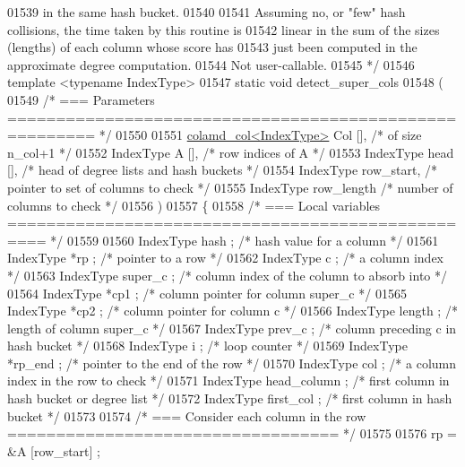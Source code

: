 \begin{DoxyCode}
{{{{{{{{{{{{{{{{{{{{{{{{{{{{01539 \textcolor{comment}{  in the same hash bucket.}
01540 \textcolor{comment}{}
01541 \textcolor{comment}{  Assuming no, or "few" hash collisions, the time taken by this routine is}
01542 \textcolor{comment}{  linear in the sum of the sizes (lengths) of each column whose score has}
01543 \textcolor{comment}{  just been computed in the approximate degree computation.}
01544 \textcolor{comment}{  Not user-callable.}
01545 \textcolor{comment}{*/}
01546 \textcolor{keyword}{template} <\textcolor{keyword}{typename} IndexType>
01547 \textcolor{keyword}{static} \textcolor{keywordtype}{void} detect\_super\_cols
01548 (
01549   \textcolor{comment}{/* === Parameters ======================================================= */}
01550   
01551   \hyperlink{structinternal_1_1colamd__col}{colamd\_col<IndexType>} Col [],    \textcolor{comment}{/* of size n\_col+1 */}
01552   IndexType A [],     \textcolor{comment}{/* row indices of A */}
01553   IndexType head [],    \textcolor{comment}{/* head of degree lists and hash buckets */}
01554   IndexType row\_start,    \textcolor{comment}{/* pointer to set of columns to check */}
01555   IndexType row\_length    \textcolor{comment}{/* number of columns to check */}
01556 )
01557 \{
01558   \textcolor{comment}{/* === Local variables ================================================== */}
01559 
01560   IndexType hash ;      \textcolor{comment}{/* hash value for a column */}
01561   IndexType *rp ;     \textcolor{comment}{/* pointer to a row */}
01562   IndexType c ;     \textcolor{comment}{/* a column index */}
01563   IndexType super\_c ;   \textcolor{comment}{/* column index of the column to absorb into */}
01564   IndexType *cp1 ;      \textcolor{comment}{/* column pointer for column super\_c */}
01565   IndexType *cp2 ;      \textcolor{comment}{/* column pointer for column c */}
01566   IndexType length ;    \textcolor{comment}{/* length of column super\_c */}
01567   IndexType prev\_c ;    \textcolor{comment}{/* column preceding c in hash bucket */}
01568   IndexType i ;     \textcolor{comment}{/* loop counter */}
01569   IndexType *rp\_end ;   \textcolor{comment}{/* pointer to the end of the row */}
01570   IndexType col ;     \textcolor{comment}{/* a column index in the row to check */}
01571   IndexType head\_column ;   \textcolor{comment}{/* first column in hash bucket or degree list */}
01572   IndexType first\_col ;   \textcolor{comment}{/* first column in hash bucket */}
01573 
01574   \textcolor{comment}{/* === Consider each column in the row ================================== */}
01575 
01576   rp = &A [row\_start] ;
}}}}}}}}}}}}}}}}}}}}}}}}}}}}
\end{DoxyCode}

